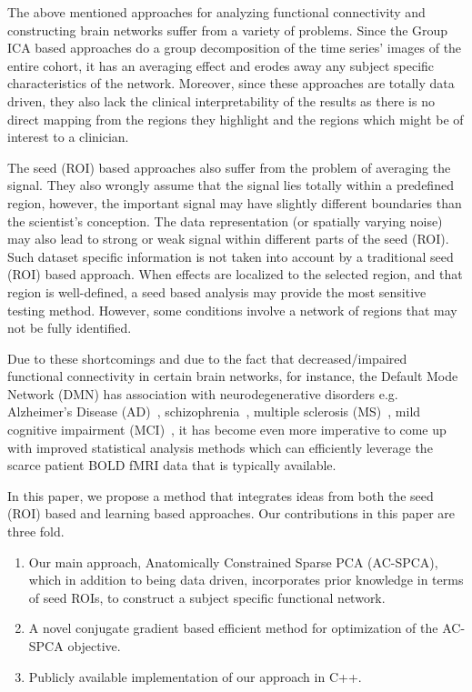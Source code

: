 \documentclass{llncs}
\begin{document}
The above mentioned approaches for analyzing functional connectivity and constructing brain networks suffer from a variety of problems. Since the Group ICA based approaches do a group decomposition of the time series' images of the entire cohort, it has an averaging effect and erodes away any subject specific characteristics of the network. Moreover, since these approaches are totally data driven, they also lack the clinical interpretability of the results as there is no direct mapping from the regions they highlight and the regions which might be of interest to a clinician. 

The seed (ROI) based approaches also suffer from the problem of averaging the signal. They also wrongly assume that the signal lies totally within a predefined region, however, the important signal may have slightly different boundaries than the scientist's
conception.  The data representation (or spatially varying noise) may
also lead to strong or weak signal within different parts of the seed (ROI).
Such dataset specific information is not taken into account by a
traditional seed (ROI) based approach.  When effects are localized to the selected region, and that region is well-defined, a seed based analysis may
provide the most sensitive testing method.  However, some conditions
involve a network of regions that may not be fully identified.

Due to these shortcomings and due to the fact that decreased/impaired functional connectivity in certain brain networks, for instance, the Default Mode Network (DMN) has association with neurodegenerative disorders e.g. Alzheimer's Disease (AD)~\cite{greicius2004default}, schizophrenia~\cite{liu2008disrupted,whitfield2009hyperactivity}, multiple sclerosis (MS)~\cite{lowe2008resting}, mild cognitive impairment (MCI)~\cite{petrella2011default}, it has become even more imperative to come up with improved statistical analysis methods which can efficiently leverage the scarce patient BOLD fMRI data that is typically available. 

In this paper, we propose a method that integrates ideas from both the seed (ROI) based and learning based approaches. Our contributions in this paper are three fold.

\begin{enumerate}
\item Our main approach, Anatomically Constrained Sparse PCA (AC-SPCA), which in addition to being data driven, incorporates prior knowledge in terms of seed ROIs, to construct a subject specific functional network.
\item A novel conjugate gradient based efficient method for optimization of the AC-SPCA objective. 
\item Publicly available implementation of our approach in C++.
\end{enumerate}
\end{document}
